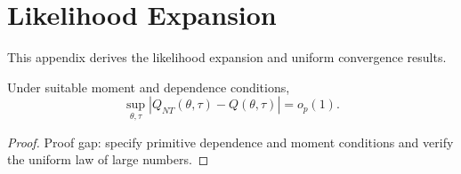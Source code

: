 \section{Likelihood Expansion}\label{app:likelihood-expansion}

This appendix derives the likelihood expansion and uniform convergence results.

\begin{lemma}\label{lem:uniform-convergence}
Under suitable moment and dependence conditions,
\[
\sup_{\theta,\tau}|Q_{NT}(\theta,\tau)-Q(\theta,\tau)|=o_p(1).
\]
\end{lemma}

\begin{proof}
Proof gap: specify primitive dependence and moment conditions and verify the uniform law of large numbers.
\end{proof}


